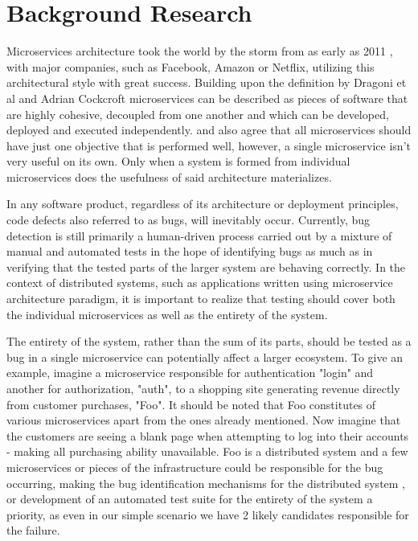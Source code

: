 \chapter{Background Research}
Microservices architecture took the world by the storm from as early as 2011 \cite{fowlerOnMicroservices}, with major companies, such as Facebook, Amazon or Netflix, utilizing this architectural style with great success. 
Building upon the definition by Dragoni et al \cite{dragoniOnMs} and Adrian Cockcroft \cite{understandingOfMicroservices} microservices can be described as pieces of software that are highly cohesive, decoupled from one another and which can be developed, deployed and executed independently. \cite{dragoniOnMs} and \cite{understandingOfMicroservices} also agree that all microservices should have just one objective that is performed well, however, a single microservice isn't very useful on its own. Only when a system is formed from individual microservices does the usefulness of said architecture materializes.

In any software product, regardless of its architecture or deployment principles, code defects also referred to as bugs, will inevitably occur. Currently, bug detection is still primarily a human-driven process carried out by a mixture of manual and automated tests in the hope of identifying bugs as much as in verifying that the tested parts of the larger system are behaving correctly. In the context of distributed systems, such as applications written using microservice architecture paradigm, it is important to realize that testing should cover both the individual microservices as well as the entirety of the system.

The entirety of the system, rather than the sum of its parts, should be tested as a bug in a single microservice can potentially affect a larger ecosystem. To give an example, imagine a microservice responsible for authentication "login" and another for authorization, "auth", to a shopping site generating revenue directly from customer purchases, "Foo". It should be noted that Foo constitutes of various microservices apart from the ones already mentioned. Now imagine that the customers are seeing a blank page when attempting to log into their accounts - making all purchasing ability unavailable. Foo is a distributed system and a few microservices or pieces of the infrastructure could be responsible for the bug occurring, making the bug identification mechanisms for the distributed system , or development of an automated test suite for the entirety of the system a priority, as even in our simple scenario we have 2 likely candidates responsible for the failure. 


